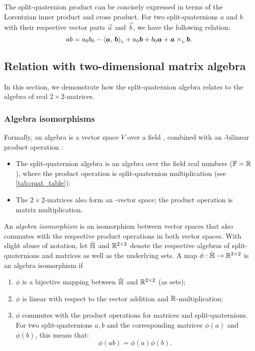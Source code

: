 The split-quaternion product can be concisely expressed in terms of the Lorentzian inner product and cross product. For two split-quaternions $a$ and $b$ with their respective vector parts $\vec{a}$ and $\vec{b}$, we have the following relation:
\begin{equation}
    ab = a_0 b_0 - \lorinner{\vec{a}}{\vec{b}} + a_0 \vec{b} + b_0 \vec{a} + \lorcrossp{\vec{a}}{\vec{b}}.
\end{equation}

\subsection{Relation with two-dimensional matrix algebra}
\label{ssec:quat_isomorphism}
In this section, we demonstrate how the split-quaternion algebra relates to the algebra of real $2\times2$-matrices.

\subsubsection{Algebra isomorphisms} 
Formally, an algebra is a vector space \(V\) over a field \field, combined with an \field-bilinear product operation \cite{Schuller2014}:
\begin{itemize}
    \item The split-quaternion algebra is an algebra over the field real numbers (\(\mathbb{F} = \mathbb{R}\)), where the product operation is split-quaternion multiplication (see \cref{tab:quat_table});
    \item The \(2\times2\)-matrices also form an \real-vector space; the product operation is matrix multiplication.
\end{itemize}

An \emph{algebra isomorphism} is an isomorphism between vector spaces that also commutes with the respective product operations in both vector spaces. With slight abuse of notation, let  $\hat{\mathbb{H}}$ and $\mathbb{R}^{2\times 2}$ denote the respective algebras of split-quaternions and matrices as well as the underlying sets. A map $\phi: \hat{\mathbb{H}} \to \mathbb{R}^{2 \times 2}$ is  an algebra isomorphism if \cite{Lang2002}
\begin{enumerate}[label=(\roman*), align=left, leftmargin=1.5cm]
    \item \(\phi \) is a bijective mapping between $\hat{\mathbb{H}}$ and $\mathbb{R}^{2\times 2}$ (as sets);
    \item \(\phi\) is linear with respect to the vector addition and $\mathbb{R}$-multiplication;   
    \item \(\phi\) commutes with the product operations for matrices and split-quaternions. For two split-quaternions $a, b$ and the corresponding matrices $\phi(a)$ and $\phi(b)$, this means that:
    \begin{equation}
        \phi(ab) = \phi(a)\phi(b).
    \end{equation}
\end{enumerate}

